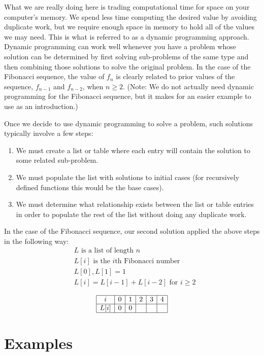 \documentclass{ximera}
\begin{document}
What we are really doing here is trading computational time for space on your computer's memory. We spend less time computing the desired value by avoiding duplicate work, but we require enough space in memory to hold all of the values we may need. This is what is referred to as a dynamic programming approach. Dynamic programming can work well whenever you have a problem whose solution can be determined by first solving sub-problems of the same type and then combining those solutions to solve the original problem. In the case of the Fibonacci sequence, the value of $f_n$ is clearly related to prior values of the sequence, $f_{n-1}$ and $f_{n-2}$, when $n\geq 2$. (Note: We do not actually need dynamic programming for the Fibonacci sequence, but it makes for an easier example to use as an introduction.)

Once we decide to use dynamic programming to solve a problem, such solutions typically involve a few steps:
\begin{enumerate}
	\item We must create a list or table where each entry will contain the solution to some related sub-problem.
	\item We must populate the list with solutions to initial cases (for recursively defined functions this would be the base cases).
	\item We must determine what relationship exists between the list or table entries in order to populate the rest of the list without doing any duplicate work.
\end{enumerate}

In the case of the Fibonacci sequence, our second solution applied the above steps in the following way:
\begin{align*}
	&L\text{ is a list of length $n$}\\
	&L[i]\text{ is the $i$th Fibonacci number}\\
	&L[0],L[1] = 1\\
	&L[i] = L[i-1]+L[i-2]\text{ for $i\geq 2$}
\end{align*}

\begin{center}
	\[
	\begin{array}{|c|c|c|c|c|c|}
		\hline
		i & 0 & 1 & 2 & 3 & 4\\
		\hline
		L[i] & 0 & 0 &  &  &  \\
		\hline
	\end{array}
	\]
\end{center}

\section{Examples}
\end{document}
